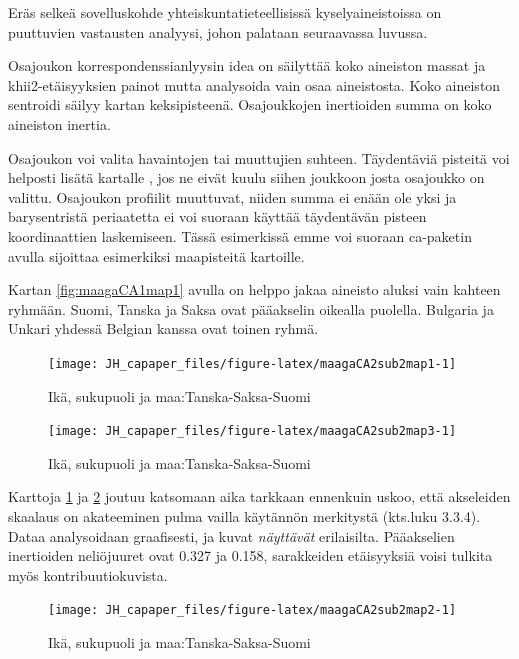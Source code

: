 \documentclass[
  finnish,
]{book}
\begin{document}
Eräs selkeä sovelluskohde yhteiskuntatieteellisissä kyselyaineistoissa on
puuttuvien vastausten analyysi, johon palataan seuraavassa luvussa.

Osajoukon korrespondenssianlyysin idea on säilyttää koko aineiston massat ja
khii2-etäisyyksien painot mutta analysoida vain osaa aineistosta. Koko aineiston
sentroidi säilyy kartan keksipisteenä. Osajoukkojen inertioiden summa on koko
aineiston inertia.

Osajoukon voi valita havaintojen tai muuttujien suhteen. Täydentäviä pisteitä
voi helposti lisätä kartalle , jos ne eivät kuulu siihen joukkoon josta
osajoukko on valittu. Osajoukon profiilit muuttuvat, niiden summa ei enään ole
yksi ja barysentristä periaatetta ei voi suoraan käyttää täydentävän pisteen
koordinaattien laskemiseen. Tässä esimerkissä emme voi suoraan ca-paketin avulla
sijoittaa esimerkiksi maapisteitä kartoille.

Kartan \ref{fig:maagaCA1map1} avulla on helppo jakaa aineisto aluksi vain kahteen ryhmään.
Suomi, Tanska ja Saksa ovat pääakselin oikealla puolella.
Bulgaria ja Unkari yhdessä Belgian kanssa ovat toinen ryhmä.

\begin{figure}

{\centering \texttt{[image: JH\_capaper\_files/figure-latex/maagaCA2sub2map1-1]} 

}

\caption{Ikä, sukupuoli ja maa:Tanska-Saksa-Suomi}\label{fig:maagaCA2sub2map1}
\end{figure}

\begin{figure}

{\centering \texttt{[image: JH\_capaper\_files/figure-latex/maagaCA2sub2map3-1]} 

}

\caption{Ikä, sukupuoli ja maa:Tanska-Saksa-Suomi}\label{fig:maagaCA2sub2map3}
\end{figure}

Karttoja \ref{fig:maagaCA2sub2map1} ja \ref{fig:maagaCA2sub2map3} joutuu katsomaan
aika tarkkaan ennenkuin uskoo, että akseleiden skaalaus on akateeminen pulma
vailla käytännön merkitystä (kts.luku 3.3.4). Dataa analysoidaan graafisesti, ja kuvat
\emph{näyttävät} erilaisilta. Pääakselien inertioiden neliöjuuret ovat
0.327 ja 0.158,
sarakkeiden etäisyyksiä voisi tulkita myös kontribuutiokuvista.

\begin{figure}

{\centering \texttt{[image: JH\_capaper\_files/figure-latex/maagaCA2sub2map2-1]} 

}

\caption{Ikä, sukupuoli ja maa:Tanska-Saksa-Suomi}\label{fig:maagaCA2sub2map2}
\end{figure}
\end{document}
